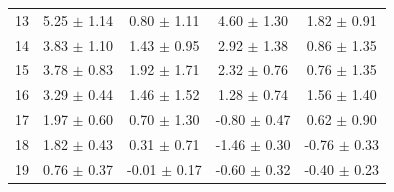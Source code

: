 \documentclass[type=dr, dr=rernat, accentcolor=tud7b,colorbacktitle, bigchapter, openright, twoside, 12pt ]{tudthesis}
\begin{document}
\begin{table}[htbp]
\begin{tabular}{|c|c|c|c|c|}
13 &5.25 $\pm$ 1.14 &0.80 $\pm$ 1.11 &4.60 $\pm$ 1.30 &1.82 $\pm$ 0.91 \\
14 &3.83 $\pm$ 1.10 &1.43 $\pm$ 0.95 &2.92 $\pm$ 1.38 &0.86 $\pm$ 1.35 \\
15 &3.78 $\pm$ 0.83 &1.92 $\pm$ 1.71 &2.32 $\pm$ 0.76 &0.76 $\pm$ 1.35 \\
16 &3.29 $\pm$ 0.44 &1.46 $\pm$ 1.52 &1.28 $\pm$ 0.74 &1.56 $\pm$ 1.40 \\
17 &1.97 $\pm$ 0.60 &0.70 $\pm$ 1.30 &-0.80 $\pm$ 0.47 &0.62 $\pm$ 0.90 \\
18 &1.82 $\pm$ 0.43 &0.31 $\pm$ 0.71 &-1.46 $\pm$ 0.30 &-0.76 $\pm$ 0.33 \\
19 &0.76 $\pm$ 0.37 &-0.01 $\pm$ 0.17 &-0.60 $\pm$ 0.32 &-0.40 $\pm$ 0.23 \\
    \hline\hline
  \end{tabular}
  \label{tab:motion:CTI:Pig1}
\end{table}
\end{document}
